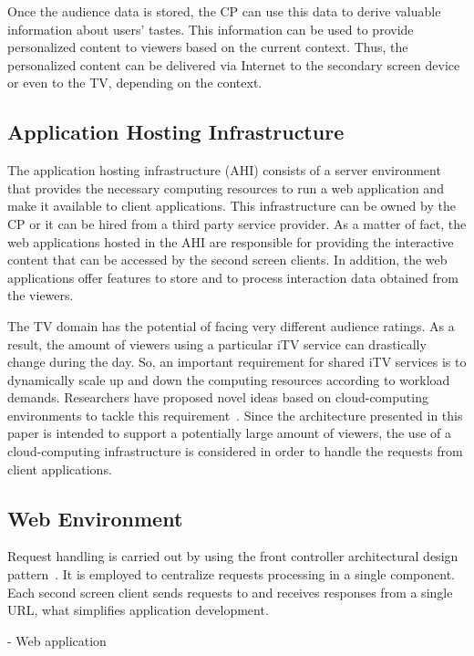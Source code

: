 \documentclass[journal]{IEEEtran}
\begin{document}
Once the audience data is stored, the CP can use this data to derive valuable information about users' tastes. This information can be used to provide personalized content to viewers based on the current context. Thus, the personalized content can be delivered via Internet to the secondary screen device or even to the TV, depending on the context.

\subsection{Application Hosting Infrastructure}

The application hosting infrastructure (AHI) consists of a server environment that provides the necessary computing resources to run a web application and make it available to client applications. This infrastructure can be owned by the CP or it can be hired from a third party service provider. As a matter of fact, the web applications hosted in the AHI are responsible for providing the interactive content that can be accessed by the second screen clients. In addition, the web applications offer features to store and to process interaction data obtained from the viewers.

The TV domain has the potential of facing very different audience ratings. As a result, the amount of viewers using a particular iTV service can drastically change during the day. So, an important requirement for shared iTV services is to dynamically scale up and down the computing resources according to workload demands. Researchers have proposed novel ideas based on cloud-computing environments to tackle this requirement~\cite{Lee2010,Lai2011}. Since the architecture presented in this paper is intended to support a potentially large amount of viewers, the use of a cloud-computing infrastructure is considered in order to handle the requests from client applications.

\subsection{Web Environment}
\label{ssub_web_environment}

Request handling is carried out by using the front controller architectural design pattern~\cite{Buschmann2007}. It is employed to centralize requests processing in a single component. Each second screen client sends requests to and receives responses from a single URL, what simplifies application development.

- Web application
\end{document}
